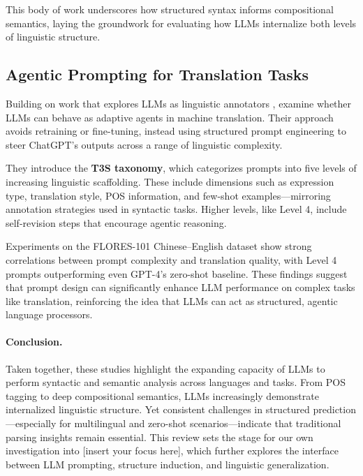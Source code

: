 This body of work underscores how structured syntax informs compositional semantics, laying the groundwork for evaluating how LLMs internalize both levels of linguistic structure.

\subsection{Agentic Prompting for Translation Tasks}

Building on work that explores LLMs as linguistic annotators \citep[e.g.,][]{lai2023chatgptpos, blevins2023llmpos}, \citet{jiao2024gradable} examine whether LLMs can behave as adaptive agents in machine translation. Their approach avoids retraining or fine-tuning, instead using structured prompt engineering to steer ChatGPT’s outputs across a range of linguistic complexity.

They introduce the \textbf{T3S taxonomy}, which categorizes prompts into five levels of increasing linguistic scaffolding. These include dimensions such as expression type, translation style, POS information, and few-shot examples—mirroring annotation strategies used in syntactic tasks. Higher levels, like Level 4, include self-revision steps that encourage agentic reasoning.

Experiments on the FLORES-101 Chinese--English dataset show strong correlations between prompt complexity and translation quality, with Level 4 prompts outperforming even GPT-4’s zero-shot baseline. These findings suggest that prompt design can significantly enhance LLM performance on complex tasks like translation, reinforcing the idea that LLMs can act as structured, agentic language processors.

\paragraph{Conclusion.}
Taken together, these studies highlight the expanding capacity of LLMs to perform syntactic and semantic analysis across languages and tasks. From POS tagging to deep compositional semantics, LLMs increasingly demonstrate internalized linguistic structure. Yet consistent challenges in structured prediction—especially for multilingual and zero-shot scenarios—indicate that traditional parsing insights remain essential. This review sets the stage for our own investigation into [insert your focus here], which further explores the interface between LLM prompting, structure induction, and linguistic generalization.

